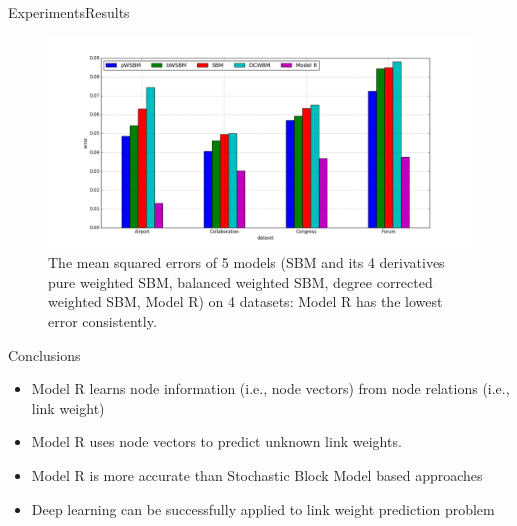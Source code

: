 \documentclass{beamer}
\begin{document}
\begin{frame}{Experiments}{Results}
	\begin{figure}[H]\centering
		\includegraphics[width=\textwidth]{link-weight-errors}
		\caption{
			The mean squared errors of 5 models (SBM and its 4 derivatives pure weighted SBM, balanced weighted SBM, degree corrected weighted SBM, Model R) on 4 datasets:
			Model R has the lowest error consistently.
		}
		\label{fig:errors}
	\end{figure}
\end{frame}

\begin{frame}{Conclusions}
	\begin{itemize}
		\item Model R learns node information (i.e., node vectors) from node relations (i.e., link weight)
		\item Model R uses node vectors to predict unknown link weights.
		\item Model R is more accurate than Stochastic Block Model based approaches
		\item Deep learning can be successfully applied to link weight prediction problem
	\end{itemize}
\end{frame}
\end{document}
